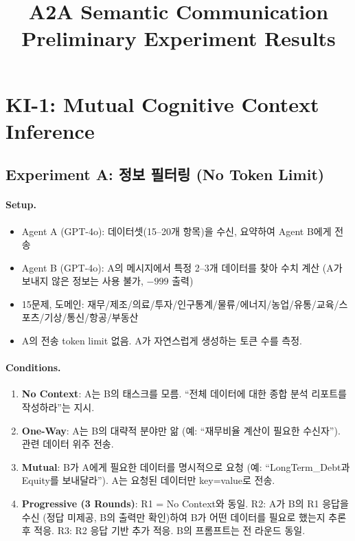 \documentclass[11pt]{article}
\title{A2A Semantic Communication\\Preliminary Experiment Results}
\author{}
\date{}
\begin{document}
\maketitle

\section{KI-1: Mutual Cognitive Context Inference}

\subsection{Experiment A: 정보 필터링 (No Token Limit)}

\paragraph{Setup.}
\begin{itemize}[nosep]
  \item Agent A (GPT-4o): 데이터셋(15--20개 항목)을 수신, 요약하여 Agent B에게 전송
  \item Agent B (GPT-4o): A의 메시지에서 특정 2--3개 데이터를 찾아 수치 계산 (A가 보내지 않은 정보는 사용 불가, $-999$ 출력)
  \item 15문제, 도메인: 재무/제조/의료/투자/인구통계/물류/에너지/농업/유통/교육/스포츠/기상/통신/항공/부동산
  \item A의 전송 token limit 없음. A가 자연스럽게 생성하는 토큰 수를 측정.
\end{itemize}

\paragraph{Conditions.}
\begin{enumerate}[nosep]
  \item \textbf{No Context}: A는 B의 태스크를 모름. ``전체 데이터에 대한 종합 분석 리포트를 작성하라''는 지시.
  \item \textbf{One-Way}: A는 B의 대략적 분야만 앎 (예: ``재무비율 계산이 필요한 수신자''). 관련 데이터 위주 전송.
  \item \textbf{Mutual}: B가 A에게 필요한 데이터를 명시적으로 요청 (예: ``LongTerm\_Debt과 Equity를 보내달라''). A는 요청된 데이터만 key=value로 전송.
  \item \textbf{Progressive (3 Rounds)}: R1 = No Context와 동일. R2: A가 B의 R1 응답을 수신 (정답 미제공, B의 출력만 확인)하여 B가 어떤 데이터를 필요로 했는지 추론 후 적응. R3: R2 응답 기반 추가 적응. B의 프롬프트는 전 라운드 동일.
\end{enumerate}
\end{document}
